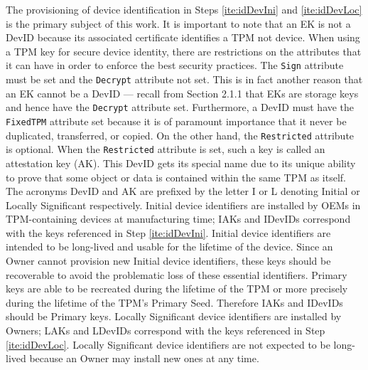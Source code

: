The provisioning of device identification in Steps \ref{ite:idDevIni} and \ref{ite:idDevLoc} is the primary subject of this work. It is important to note that an EK is not a DevID because its associated certificate identifies a TPM not device. 
When using a TPM key for secure device identity, there are restrictions on the attributes that it can have in order to enforce the best security practices. The \verb|Sign| attribute must be set and the \verb|Decrypt| attribute not set. This is in fact another reason that an EK cannot be a DevID --- recall from Section 2.1.1 that EKs are storage keys and hence have the \verb|Decrypt| attribute set. Furthermore, a DevID must have the \verb|FixedTPM| attribute set because it is of paramount importance that it never be duplicated, transferred, or copied. On the other hand, the \verb|Restricted| attribute is optional. When the \verb|Restricted| attribute is set, such a key is called an attestation key (AK). This DevID gets its special name due to its unique ability to prove that some object or data is contained within the same TPM as itself. The acronyms DevID and AK are prefixed by the letter I or L denoting Initial or Locally Significant respectively. Initial device identifiers are installed by OEMs in TPM-containing devices at manufacturing time; IAKs and IDevIDs correspond with the keys referenced in Step \ref{ite:idDevIni}. Initial device identifiers are intended to be long-lived and usable for the lifetime of the device. Since an Owner cannot provision new Initial device identifiers, these keys should be recoverable to avoid the problematic loss of these essential identifiers. Primary keys are able to be recreated during the lifetime of the TPM or more precisely during the lifetime of the TPM’s Primary Seed. Therefore IAKs and IDevIDs should be Primary keys. Locally Significant device identifiers are installed by Owners; LAKs and LDevIDs correspond with the keys referenced in Step \ref{ite:idDevLoc}. Locally Significant device identifiers are not expected to be long-lived because an Owner may install new ones at any time. 


